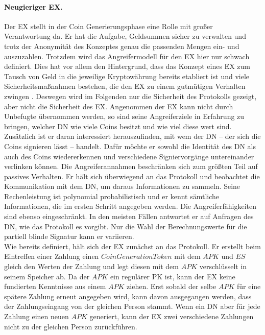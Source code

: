 \documentclass[
	fontsize=11pt,
	headings=small,
	parskip=half,           %
	bibliography=totoc,
	numbers=noenddot,       %
	open=any,               %
]{scrreprt}
\begin{document}
\paragraph{Neugieriger EX.}
Der EX stellt in der Coin Generierungsphase eine Rolle mit großer Verantwortung da. Er hat die Aufgabe, Geldsummen sicher zu verwalten und trotz der Anonymität des Konzeptes genau die passenden Mengen ein- und auszuzahlen. Trotzdem wird das Angreifermodell für den EX hier nur schwach definiert. Dies hat vor allem den Hintergrund, dass das Konzept eines EX zum Tausch von Geld in die jeweilige Kryptowährung bereits etabliert ist und viele Sicherheitsmaßnahmen bestehen, die den EX zu einem gutmütigen Verhalten zwingen \cite{gnu-burdges2016enabling,kim2018risk,baum2021p2dex}. Deswegen wird im Folgenden nur die Sicherheit des Protokolls gezeigt, aber nicht die Sicherheit des EX.
Angenommen der EX kann nicht durch Unbefugte übernommen werden, so sind seine Angreiferziele in Erfahrung zu bringen, welcher DN wie viele Coins besitzt und wie viel diese wert sind. Zusätzlich ist er daran interessiert herauszufinden, mit wem der DN -- der sich die Coins signieren lässt -- handelt. Dafür möchte er sowohl die Identität des DN als auch des Coins wiedererkennen und verschiedene Signiervorgänge untereinander verlinken können. Die Angreiferannahmen beschränken sich zum größten Teil auf passives Verhalten. Er hält sich überwiegend an das Protokoll und beobachtet die Kommunikation mit dem DN, um daraus Informationen zu sammeln. Seine Rechenleistung ist polynomial probabilistisch und er kennt sämtliche Informationen, die im ersten Schritt angegeben werden. Die Angreiferfähigkeiten sind ebenso eingeschränkt. In den meisten Fällen antwortet er auf Anfragen des DN, wie das Protokoll es vorgibt. Nur die Wahl der Berechnungswerte für die partiell blinde Signatur kann er variieren.\\

Wie bereits definiert, hält sich der EX zunächst an das Protokoll. Er erstellt beim Eintreffen einer Zahlung einen $CoinGenerationToken$ mit dem $APK$ und $ES$ gleich den Werten der Zahlung und legt diesen mit dem $APK$ verschlüsselt in seinem Speicher ab. Da der $APK$ ein regulärer PK ist, kann der EX keine fundierten Kenntnisse aus einem $APK$ ziehen. Erst sobald der selbe $APK$ für eine spätere Zahlung erneut angegeben wird, kann davon ausgegangen werden, dass der Zahlungseingang von der gleichen Person stammt. Wenn ein DN aber für jede Zahlung einen neuen $APK$ generiert, kann der EX zwei verschiedene Zahlungen nicht zu der gleichen Person zurückführen.
\end{document}
